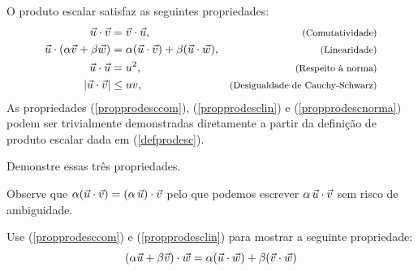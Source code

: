 O produto escalar satisfaz as seguintes propriedades:
\begin{subequations}\label{proprodesc}
\begin{align}
\vec{u}\cdot\vec{v}&=\vec{v}\cdot\vec{u},&\hbox{\footnotesize (Comutatividade)}\label{propprodesccom}\\
\vec{u}\cdot\left(\alpha\vec{v}+\beta \vec{w}\right)&=\alpha(\vec{u}\cdot\vec{v})+\beta(\vec{u}\cdot\vec{w}) ,&\hbox{\footnotesize (Linearidade)}\label{propprodesclin}\\
\vec{u}\cdot\vec{u}&=u^2,&\hbox{\footnotesize (Respeito à norma)}\label{propprodescnorma}\\
\left|\vec{u}\cdot\vec{v}\right|&\leq uv,&\hbox{\footnotesize (Desigualdade de Cauchy-Schwarz)}\label{propprodesccauchy}
\end{align}
\end{subequations}
As propriedades (\ref{propprodesccom}), (\ref{propprodesclin}) e (\ref{propprodescnorma}) podem ser trivialmente demonstradas diretamente a partir da definição de produto escalar dada em (\ref{defprodesc}).
\begin{prob} Demonstre essas três propriedades.
\end{prob}
Observe que $\alpha(\vec{u}\cdot\vec{v})=(\alpha~\!\vec{u})\cdot\vec{v}$ pelo que podemos escrever $\alpha~\!\vec{u}\cdot\vec{v}$ sem risco de ambiguidade.  
\begin{prob} Use (\ref{propprodesccom}) e  (\ref{propprodesclin}) para mostrar a seguinte propriedade:
$$
\left(\alpha\vec{u}+\beta \vec{v}\right)\cdot \vec{w}=\alpha (\vec{u}\cdot\vec{w})+ \beta (\vec{v}\cdot\vec{w})
$$

\end{prob}
% 
% 
